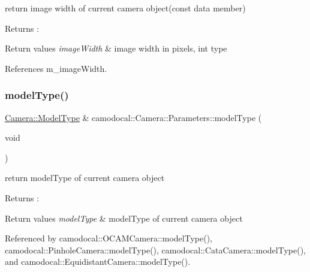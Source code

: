 return image width of current camera object(const data member) 

\begin{DoxyReturn}{Returns}
\+: 
\end{DoxyReturn}

\begin{DoxyRetVals}{Return values}
{\em image\+Width} & image width in pixels, int type \\
\hline
\end{DoxyRetVals}


References m\+\_\+image\+Width.

\mbox{\label{classcamodocal_1_1Camera_1_1Parameters_aab8170228d7e26e10b231c5960d5ddf7}} 
\subsubsection{\texorpdfstring{model\+Type()}{modelType()}\hspace{0.1cm}{\footnotesize\ttfamily [1/2]}}
{\footnotesize\ttfamily \hyperlink{classcamodocal_1_1Camera_a663bb19b7b1f38f6d1b7eeb0890183ff}{Camera\+::\+Model\+Type} \& camodocal\+::\+Camera\+::\+Parameters\+::model\+Type (\begin{DoxyParamCaption}\item[{void}]{ }\end{DoxyParamCaption})}



return model\+Type of current camera object 

\begin{DoxyReturn}{Returns}
\+: 
\end{DoxyReturn}

\begin{DoxyRetVals}{Return values}
{\em model\+Type} & model\+Type of current camera object \\
\hline
\end{DoxyRetVals}


Referenced by camodocal\+::\+O\+C\+A\+M\+Camera\+::model\+Type(), camodocal\+::\+Pinhole\+Camera\+::model\+Type(), camodocal\+::\+Cata\+Camera\+::model\+Type(), and camodocal\+::\+Equidistant\+Camera\+::model\+Type().

